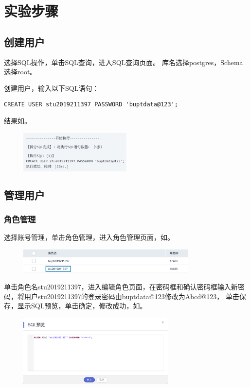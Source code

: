 \documentclass[lang=cn,11pt,a4paper,cite=authornum]{paper}
\begin{document}
\section{实验步骤}

\subsection{创建用户}

选择SQL操作，单击SQL查询，进入SQL查询页面。
库名选择postgres，Schema选择root。

创建用户，输入以下SQL语句：
\begin{code}
\begin{verbatim}
CREATE USER stu2019211397 PASSWORD 'buptdata@123';
\end{verbatim}
\end{code}

结果如。
\begin{figure}[!htb]
    \centering
    \includegraphics[width=0.5\textwidth]{./images/res1.png}
    \caption{\label{fig:res1}}
\end{figure}

\subsection{管理用户}

\subsubsection{角色管理}

选择账号管理，单击角色管理，进入角色管理页面，如。
\begin{figure}[!htb]
    \centering
    \includegraphics[width=0.8\textwidth]{./images/res2.png}
    \caption{\label{fig:res2}}
\end{figure}

单击角色名stu2019211397，进入编辑角色页面，在密码框和确认密码框输入新密码，将用户stu2019211397的登录密码由buptdata@123修改为Abcd@123，
单击保存，显示SQL预览，单击确定，修改成功，如。
\begin{figure}[!htb]
    \centering
    \includegraphics[width=0.7\textwidth]{./images/res3.png}
    \caption{\label{fig:res3}}
\end{figure}
\end{document}
